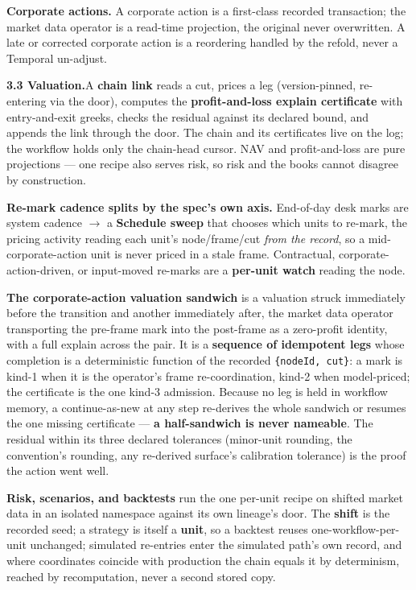 \documentclass[11pt,a4paper]{article}
\begin{document}
\textbf{Corporate actions.} A corporate action is a first-class recorded transaction; the market data
operator is a read-time projection, the original never overwritten. A late or corrected corporate
action is a reordering handled by the refold, never a Temporal un-adjust.

\textbf{3.3 Valuation.}\quad A \textbf{chain link} reads a cut, prices a leg (version-pinned,
re-entering via the door), computes the \textbf{profit-and-loss explain certificate} with entry-and-exit
greeks, checks the residual against its declared bound, and appends the link through the door. The chain
and its certificates live on the log; the workflow holds only the chain-head cursor. NAV and
profit-and-loss are pure projections --- one recipe also serves risk, so risk and the books cannot
disagree by construction.

\textbf{Re-mark cadence splits by the spec's own axis.} End-of-day desk marks are system cadence $\to$ a
\textbf{Schedule sweep} that chooses which units to re-mark, the pricing activity reading each unit's
node/frame/cut \emph{from the record}, so a mid-corporate-action unit is never priced in a stale frame.
Contractual, corporate-action-driven, or input-moved re-marks are a \textbf{per-unit watch} reading the
node.

\textbf{The corporate-action valuation sandwich} is a valuation struck immediately before the transition
and another immediately after, the market data operator transporting the pre-frame mark into the
post-frame as a zero-profit identity, with a full explain across the pair. It is a \textbf{sequence of
idempotent legs} whose completion is a deterministic function of the recorded \texttt{\{nodeId, cut\}}: a
mark is kind-1 when it is the operator's frame re-coordination, kind-2 when model-priced; the certificate
is the one kind-3 admission. Because no leg is held in workflow memory, a continue-as-new at any step
re-derives the whole sandwich or resumes the one missing certificate --- \textbf{a half-sandwich is never
nameable}. The residual within its three declared tolerances (minor-unit rounding, the convention's
rounding, any re-derived surface's calibration tolerance) is the proof the action went well.

\textbf{Risk, scenarios, and backtests} run the one per-unit recipe on shifted market data in an isolated
namespace against its own lineage's door. The \textbf{shift} is the recorded seed; a strategy is itself a
\textbf{unit}, so a backtest reuses one-workflow-per-unit unchanged; simulated re-entries enter the
simulated path's own record, and where coordinates coincide with production the chain equals it by
determinism, reached by recomputation, never a second stored copy.
\end{document}

